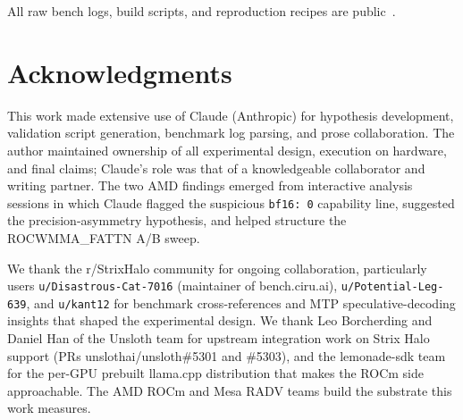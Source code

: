 \documentclass[10pt,a4paper]{article}
\begin{document}
All raw bench logs, build scripts, and reproduction recipes are public~\cite{benchdata,guide}.

\section*{Acknowledgments}

This work made extensive use of Claude (Anthropic) for hypothesis development, validation script generation, benchmark log parsing, and prose collaboration. The author maintained ownership of all experimental design, execution on hardware, and final claims; Claude's role was that of a knowledgeable collaborator and writing partner. The two AMD findings emerged from interactive analysis sessions in which Claude flagged the suspicious \texttt{bf16: 0} capability line, suggested the precision-asymmetry hypothesis, and helped structure the ROCWMMA\_FATTN A/B sweep.

We thank the r/StrixHalo community for ongoing collaboration, particularly users \texttt{u/Disastrous-Cat-7016} (maintainer of bench.ciru.ai), \texttt{u/Potential-Leg-639}, and \texttt{u/kant12} for benchmark cross-references and MTP speculative-decoding insights that shaped the experimental design. We thank Leo Borcherding and Daniel Han of the Unsloth team for upstream integration work on Strix Halo support (PRs unslothai/unsloth\#5301 and \#5303), and the lemonade-sdk team for the per-GPU prebuilt llama.cpp distribution that makes the ROCm side approachable. The AMD ROCm and Mesa RADV teams build the substrate this work measures.
\end{document}
